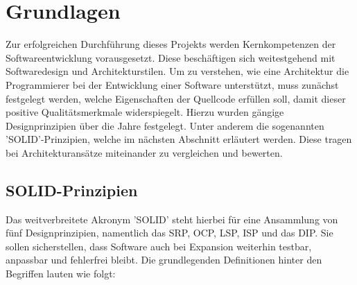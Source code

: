 

\chapter{Grundlagen}

Zur erfolgreichen Durchführung dieses Projekts werden Kernkompetenzen der Softwareentwicklung vorausgesetzt. Diese beschäftigen sich weitestgehend mit Softwaredesign und Architekturstilen. Um zu verstehen, wie eine Architektur die Programmierer bei der Entwicklung einer Software unterstützt, muss zunächst festgelegt werden, welche Eigenschaften der Quellcode erfüllen soll, damit dieser positive Qualitätsmerkmale widerspiegelt. Hierzu wurden gängige Designprinzipien über die Jahre festgelegt. Unter anderem die sogenannten 'SOLID'-Prinzipien, welche im nächsten Abschnitt erläutert werden. Diese tragen bei Architekturansätze miteinander zu vergleichen und bewerten.

\section{SOLID-Prinzipien}

Das weitverbreitete Akronym 'SOLID' steht hierbei für eine Ansammlung von fünf Designprinzipien, namentlich das \acrfull{SRP}, \acrfull{OCP}, \acrfull{LSP}, \acrfull{ISP} und das \acrfull{DIP}. Sie sollen sicherstellen, dass Software auch bei Expansion weiterhin testbar, anpassbar und fehlerfrei bleibt. Die grundlegenden Definitionen hinter den Begriffen lauten wie folgt:

